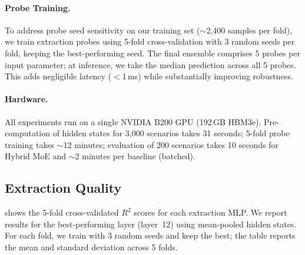 \paragraph{Probe Training.}
To address probe seed sensitivity on our training set
(${\sim}$2{,}400 samples per fold), we train extraction probes using
5-fold cross-validation with 3 random seeds per fold, keeping the
best-performing seed. The final ensemble comprises 5 probes per
input parameter; at inference, we take the median prediction across
all 5 probes. This adds negligible latency ($<$1\,ms) while
substantially improving robustness.

\paragraph{Hardware.}
All experiments run on a single NVIDIA B200 GPU (192\,GB HBM3e).
Pre-computation of hidden states for 3{,}000 scenarios takes 31
seconds; 5-fold probe training takes ${\sim}$12 minutes;
evaluation of 200 scenarios takes 10 seconds for Hybrid MoE and
${\sim}$2 minutes per baseline (batched).

\subsection{Extraction Quality}
\label{sec:exp:extraction}

 shows the 5-fold cross-validated $R^2$ scores for
each extraction MLP. We report results for the best-performing layer
(layer~12) using mean-pooled hidden states. For each fold, we train
with 3 random seeds and keep the best; the table reports the mean and
standard deviation across 5 folds.

